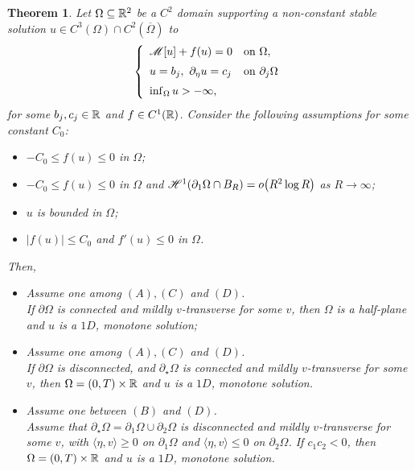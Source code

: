 \documentclass[10 pt,a4paper]{article}
\newtheorem{theorem}[definition]{Theorem}
\theoremstyle{definition}
\begin{document}
\begin{theorem}\label{teo_CMC_intro_R2_gen}
	Let $\Omega \subseteq \mathbb R^2$ be a $C^2$ domain supporting a non-constant stable solution $u \in C^3(\Omega) \cap C^2(\overline\Omega)$ to 
	\[
		\left\{ 
		\begin{array}{ll}
			\mathscr{M}[u]  + f(u) = 0 & \text{on } \Omega, \\[0.2cm]
			u = b_j, \ \partial_\eta u = c_j  & \text{on $\partial_j \Omega$} \\[0.2cm]
			\inf_\Omega u > -\infty,
		\end{array} \right.
	\]
	for some $b_j,c_j \in \mathbb R$ and $f \in C^1(\mathbb R)$. Consider the following assumptions for some constant $C_0$:
	\begin{itemize}
		\item[(A)] $- C_0 \le f(u) \le 0$ in $\Omega$; %
		\item[(B)] $- C_0 \le f(u) \le 0$ in $\Omega$ and $\mathscr{H}^{1}(\partial_1\Omega \cap B_R)= o \big(R^2 \log R\big)$ as $R \to \infty$;
		\item[(C)] $u$ is bounded in $\Omega$; %
		\item[(D)] $|f(u)| \leq C_0$ and $f'(u) \le 0$ in $\Omega$.
	\end{itemize}			
	Then, 
	\begin{itemize}
		\item[(i)] Assume one among $(A),(C)$ and $(D)$.\\
		If $\partial \Omega$ is connected and mildly $v$-transverse for some $v$, then $\Omega$ is a half-plane and $u$ is a $1D$, monotone solution;
		\item[(ii)] Assume one among $(A),(C)$ and $(D)$.\\
		If $\partial \Omega$ is disconnected, and $\partial_\star \Omega$ is connected and mildly $v$-transverse for some $v$, then $\Omega = (0,T) \times \mathbb R$ and $u$ is a $1D$, monotone solution.
		\item[(iii)] Assume one between $(B)$ and $(D)$.\\
		Assume that $\partial_\star \Omega = \partial_1\Omega \cup \partial_2\Omega$ is disconnected and mildly $v$-transverse for some $v$, with $\langle \eta,v \rangle \ge 0$ on $\partial_1\Omega$ and $\langle \eta,v \rangle \le 0$ on $\partial_2\Omega$. If $c_1c_2<0$, then $\Omega = (0,T) \times \mathbb R$ and $u$ is a $1D$, monotone solution.	

\end{itemize}
\end{theorem}
\end{document}
